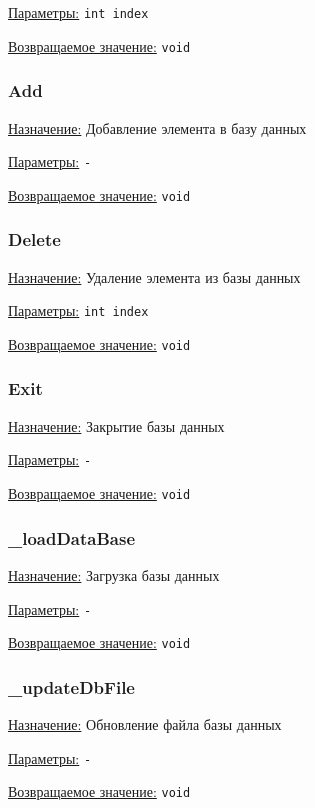 \underline{Параметры:} \verb|int index|

\underline{Возвращаемое значение:} \verb|void|


\subsubsection{Add}

\underline{Назначение:}
Добавление элемента в базу данных

\underline{Параметры:} \verb|-|

\underline{Возвращаемое значение:} \verb|void|


\subsubsection{Delete}

\underline{Назначение:}
Удаление элемента из базы данных

\underline{Параметры:} \verb|int index|

\underline{Возвращаемое значение:} \verb|void|


\subsubsection{Exit}

\underline{Назначение:}
Закрытие базы данных

\underline{Параметры:} \verb|-|

\underline{Возвращаемое значение:} \verb|void|


\subsubsection{\_loadDataBase}

\underline{Назначение:}
Загрузка базы данных

\underline{Параметры:} \verb|-|

\underline{Возвращаемое значение:} \verb|void|


\subsubsection{\_updateDbFile}

\underline{Назначение:}
Обновление файла базы данных

\underline{Параметры:} \verb|-|

\underline{Возвращаемое значение:} \verb|void|

